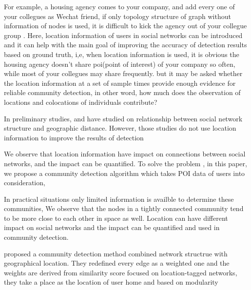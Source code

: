 For example, a housing agency comes to your company, and add every one of your collegues as Wechat friend, 
if  only topology structure of graph without information of nodes is used, it is difficult to kick the agency out of your collegue group .
Here, location information of users in social networks can be introduced 
and it can help with the main goal of improving the accuracy of detection results based on ground truth, 
i,e, when location information is used,
it is obvious the housing agency doesn't share poi(point of interest) of your company so often, 
while most of your collegues may share frequently.
but it may be asked whether the location information at a set of sample times 
provide enough evidence for reliable community detection,
in other word, 
how much does the observation of locations and colocations of individuals contribute?

In preliminary studies, 
\cite{} and \cite{} have studied on relationship between social network structure and geographic distance.
However, those studies do not use location information to improve the results of detection

We observe that location information have impact on connections between social networks,
and the impact can be quantified. To solve the problem , in this paper,
we propose a community detection algorithm which takes POI data of users into consideration,





In practical situations only limited information is availble to determine these communities,
We observe that the nodes in a tightly connected community tend to be more close to each other in
space as well.
Location can have different impact on social networks and the impact can be quantified and used 
in community detection.





\cite{} proposed a community detection method combined network structrue with geographical location.
They redefined every edge as a weighted one and the weights are derived from similarity score 
focused on location-tagged networks, 
they take a place as the location of user home
and based on modularity 









